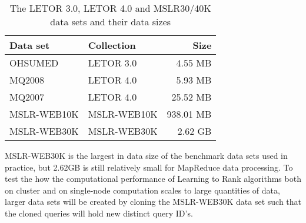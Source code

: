 \begin{table}[!h]
\centering
\begin{tabular}{p{3.4cm}p{3.4cm}r}\toprule
Data set & Collection & Size \\
\midrule
OHSUMED     & LETOR 3.0       &   4.55 MB\\
MQ2008      & LETOR 4.0       &   5.93 MB\\
MQ2007      & LETOR 4.0       &  25.52 MB\\
MSLR-WEB10K & MSLR-WEB10K     & 938.01 MB\\
MSLR-WEB30K & MSLR-WEB30K     &   2.62 GB\\
\bottomrule
\end{tabular}
\caption{The LETOR 3.0, LETOR 4.0 and MSLR30/40K data sets and their data sizes}
\label{tbl:initial_datasets}
\end{table}

MSLR-WEB30K is the largest in data size of the benchmark data sets used in practice, but 2.62GB is still relatively small for MapReduce data processing. To test the how the computational performance of Learning to Rank algorithms both on cluster and on single-node computation scales to large quantities of data, larger data sets will be created by cloning the MSLR-WEB30K data set such that the cloned queries will hold new distinct query ID's.

